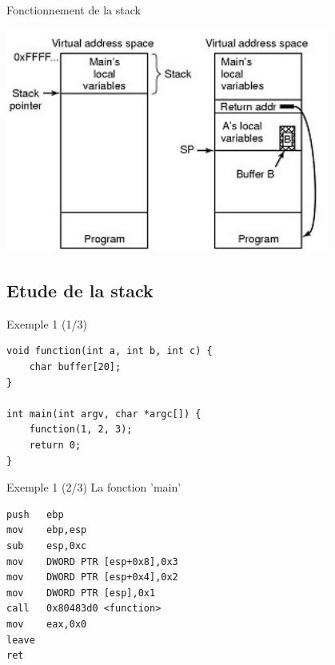 \documentclass{beamer}
\begin{document}
\begin{frame}{Fonctionnement de la stack}
	\begin{center}
		\includegraphics[width=0.8\textwidth]{images/stack.jpg}
	\end{center}
\end{frame}

\subsection{Etude de la stack}

\begin{frame}[fragile]{Exemple 1 (1/3)}
	\begin{verbatim}
void function(int a, int b, int c) {
    char buffer[20];
}

int main(int argv, char *argc[]) {
    function(1, 2, 3);
    return 0;
}
	\end{verbatim}
\end{frame}

\begin{frame}[fragile]{Exemple 1 (2/3)}
	La fonction 'main'
	\begin{verbatim}
push   ebp
mov    ebp,esp
sub    esp,0xc
mov    DWORD PTR [esp+0x8],0x3
mov    DWORD PTR [esp+0x4],0x2
mov    DWORD PTR [esp],0x1
call   0x80483d0 <function>
mov    eax,0x0
leave  
ret
	\end{verbatim}
\end{frame}
\end{document}
